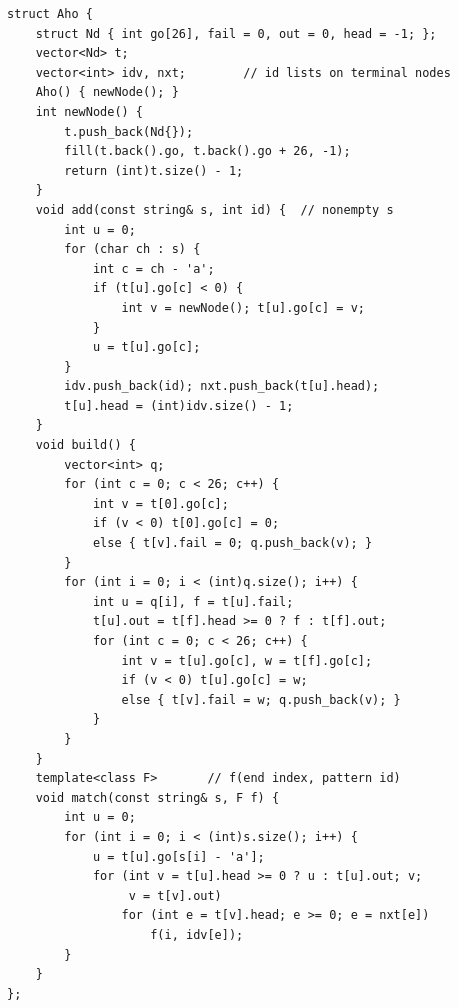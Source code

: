 \begin{lstlisting}
struct Aho {
    struct Nd { int go[26], fail = 0, out = 0, head = -1; };
    vector<Nd> t;
    vector<int> idv, nxt;        // id lists on terminal nodes
    Aho() { newNode(); }
    int newNode() {
        t.push_back(Nd{});
        fill(t.back().go, t.back().go + 26, -1);
        return (int)t.size() - 1;
    }
    void add(const string& s, int id) {  // nonempty s
        int u = 0;
        for (char ch : s) {
            int c = ch - 'a';
            if (t[u].go[c] < 0) {
                int v = newNode(); t[u].go[c] = v;
            }
            u = t[u].go[c];
        }
        idv.push_back(id); nxt.push_back(t[u].head);
        t[u].head = (int)idv.size() - 1;
    }
    void build() {
        vector<int> q;
        for (int c = 0; c < 26; c++) {
            int v = t[0].go[c];
            if (v < 0) t[0].go[c] = 0;
            else { t[v].fail = 0; q.push_back(v); }
        }
        for (int i = 0; i < (int)q.size(); i++) {
            int u = q[i], f = t[u].fail;
            t[u].out = t[f].head >= 0 ? f : t[f].out;
            for (int c = 0; c < 26; c++) {
                int v = t[u].go[c], w = t[f].go[c];
                if (v < 0) t[u].go[c] = w;
                else { t[v].fail = w; q.push_back(v); }
            }
        }
    }
    template<class F>       // f(end index, pattern id)
    void match(const string& s, F f) {
        int u = 0;
        for (int i = 0; i < (int)s.size(); i++) {
            u = t[u].go[s[i] - 'a'];
            for (int v = t[u].head >= 0 ? u : t[u].out; v;
                 v = t[v].out)
                for (int e = t[v].head; e >= 0; e = nxt[e])
                    f(i, idv[e]);
        }
    }
};
\end{lstlisting}


